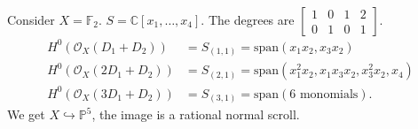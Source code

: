 \documentclass[a4paper,12pt]{amsart}
\begin{document}
\begin{example}
	Consider $X=\mathbb{F}_2$. $S = \mathbb{C}[x_1,\dotsc,x_4]$. The degrees are $\begin{bmatrix}1 & 0 & 1 & 2 \\ 0 & 1 & 0 & 1 \end{bmatrix}$.
	\begin{equation}
		\begin{aligned}
		H^0(\mathcal{O}_X(D_1 + D_2)) &= S_{(1,1)} = \text{span}(x_1 x_2,x_3 x_2) \\
		H^0(\mathcal{O}_X(2D_1 + D_2)) &= S_{(2,1)} = \text{span}(x_1^2 x_2,x_1 x_3 x_2, x_3^2 x_2, x_4) \\
		H^0(\mathcal{O}_X(3D_1 + D_2)) &= S_{(3,1)} = \text{span}(\text{6 monomials}).
		\end{aligned}
	\end{equation}
	We get $X \hookrightarrow \mathbb{P}^5$, the image is a rational normal scroll.
\end{example}
\end{document}
